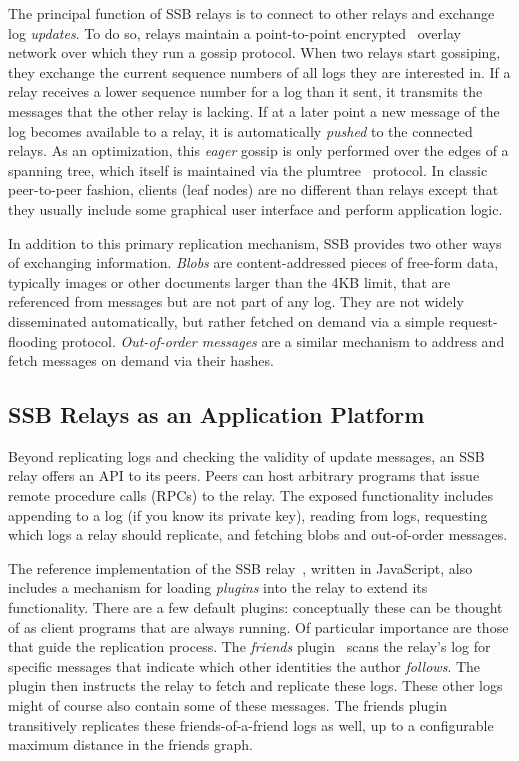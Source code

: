\documentclass[9pt,sigconf]{acmart}
\begin{document}
The principal function of SSB relays is to connect to other relays and
exchange log {\em updates}. To do so, relays maintain a point-to-point
encrypted~\cite{tarr2015secrethandshake} overlay network over which
they run a gossip protocol. When two relays start gossiping, they
exchange the current sequence numbers of all logs they are interested
in. If a relay receives a lower sequence number for a log than it
sent, it transmits the messages that the other relay is lacking. If at
a later point a new message of the log becomes available to a relay,
it is automatically \textit{pushed} to the connected relays. As an
optimization, this {\em eager} gossip is only performed over the edges
of a spanning tree, which itself is maintained via the
plumtree~\cite{leitao2007epidemic} protocol. In classic peer-to-peer
fashion, clients (leaf nodes) are no different than relays except that
they usually include some graphical user interface and perform
application logic.

In addition to this primary replication mechanism, SSB provides two
other ways of exchanging information. {\em Blobs} are
content-addressed pieces of free-form data, typically images or other
documents larger than the 4KB limit, that are referenced from messages
but are not part of any log. They are not widely disseminated
automatically, but rather fetched on demand via a simple
request-flooding protocol. {\em Out-of-order messages} are a similar
mechanism to address and fetch messages on demand via their hashes.

\subsection*{SSB Relays as an Application Platform}

Beyond replicating logs and checking the validity of update messages,
an SSB relay offers an API to its peers. Peers can host arbitrary
programs that issue remote procedure calls (RPCs) to the relay. The
exposed functionality includes appending to a log (if you know its
private key), reading from logs, requesting which logs a relay should
replicate, and fetching blobs and out-of-order messages.

The reference implementation of the SSB relay~\cite{ssb-server},
written in JavaScript, also includes a mechanism for loading {\em
  plugins} into the relay to extend its functionality. There are a few
default plugins: conceptually these can be thought of as client
programs that are always running. Of particular importance are those
that guide the replication process. The {\em friends}
plugin~\cite{ssb-friends} scans the relay's log for specific messages
that indicate which other identities the author {\em follows}. The
plugin then instructs the relay to fetch and replicate these
logs. These other logs might of course also contain some of these
messages. The friends plugin transitively replicates these
friends-of-a-friend logs as well, up to a configurable maximum
distance in the friends graph.
\end{document}
